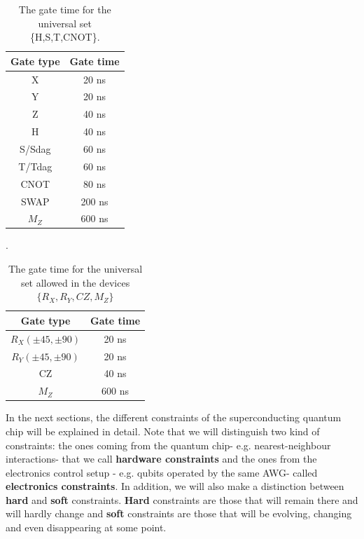 \documentclass[11pt]{article}
\begin{document}
\begin{table}[bth!]
\centering
\caption{The gate time for the universal set \{H,S,T,CNOT\}.} 
\label{uni_set_gatetime}
\begin{tabular}{c|c}
\hline
Gate type & Gate time \\ \hline
X         & 20 ns     \\ 
Y         & 20 ns     \\ 
Z         & 40 ns     \\ 
H         & 40 ns     \\ 
S/Sdag    & 60 ns          \\ 
T/Tdag    & 60 ns          \\ 
CNOT      & 80 ns     \\ 
SWAP      & 200 ns    \\ 
$M_{Z}$         &  600 ns          \\ \hline
\end{tabular}
\end{table}

\begin{table}[bth!]
\centering
\caption{The gate time for the universal set allowed in the devices $\{R_{X},R_{Y},CZ,M_{Z}\}$}.
\label{sc_set_gatetime}
\begin{tabular}{c|c}
\hline
Gate type & Gate time \\ \hline
$R_{X}(\pm 45, \pm90)$         & 20 ns     \\ 
$R_{Y}(\pm 45, \pm90)$       & 20 ns     \\ 
CZ        & 40 ns     \\ 
$M_{Z}$         &  600 ns          \\ \hline
\end{tabular}
\end{table}

In the next sections, the different constraints of the superconducting quantum chip will be explained in detail. Note that we will distinguish two kind of constraints: the ones coming from the quantum chip- e.g. nearest-neighbour interactions- that we call \textbf{hardware constraints} and the ones from the electronics control setup - e.g. qubits operated by the same AWG- called \textbf{electronics constraints}. In addition, we will also make a distinction between \textbf{hard} and \textbf{soft} constraints. \textbf{Hard} constraints are those that will remain there and will hardly change and \textbf{soft} constraints are those that will be evolving, changing and even disappearing at some point. 
\end{document}
